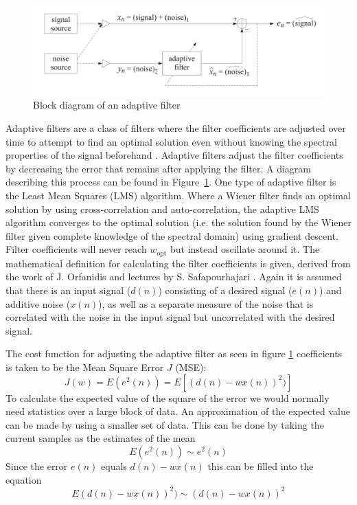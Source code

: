 \begin{figure}[h!t]
	\begin{center}
		\includegraphics[width=1.0\columnwidth]{images/adaptive_filter_block_diagram.png}
	\end{center}
	\caption{Block diagram of an adaptive filter \cite{introduction_optimal_signal_processing}}
	\label{fig:adaptive_filter_diagram}
\end{figure}

Adaptive filters are a class of filters where the filter coefficients are adjusted over time to attempt to find an optimal solution even without knowing the spectral properties of the signal beforehand \cite{adaptive_filter_and_applications}. Adaptive filters adjust the filter coefficients by decreasing the error that remains after applying the filter. A diagram describing this process can be found in Figure~\ref{fig:adaptive_filter_diagram}. 
One type of adaptive filter is the Least Mean Squares (LMS) algorithm. Where a Wiener filter finds an optimal solution by using cross-correlation and auto-correlation, the adaptive LMS algorithm converges to the optimal solution (i.e. the solution found by the Wiener filter given complete knowledge of the spectral domain) using gradient descent. Filter coefficients will never reach $w_\text{opt}$ but instead oscillate around it. The mathematical definition for calculating the filter coefficients is given, derived from the work of J. Orfanidis \cite[Ch. 7.3]{introduction_optimal_signal_processing} and lectures by S. Safapourhajari \cite{lecture_adaptive_filters_2}. Again it is assumed that there is an input signal ($d(n)$) consisting of a desired signal ($e(n)$) and additive noise ($x(n)$), as well as a separate measure of the noise that is correlated with the noise in the input signal but uncorrelated with the desired signal.

The cost function for adjusting the adaptive filter as seen in figure \ref{fig:adaptive_filter_diagram} coefficients is taken to be the Mean Square Error $J$ (MSE):
\begin{equation}
    J(w) = E(e^2(n)) = E[(d(n) - wx(n))^2)]
\end{equation}
To calculate the expected value of the square of the error we would normally need statistics over a large block of data. An approximation of the expected value can be made by using a smaller set of data. This can be done by taking the current samples as the estimates of the mean
\begin{equation}
    E(e^2(n)) \sim e^2(n)
\end{equation}
Since the error $e(n)$ equals $d(n) - wx(n)$ this can be filled into the equation
\begin{equation}
    E(d(n) - wx(n))^2) \sim (d(n) - wx(n))^2
\end{equation}

